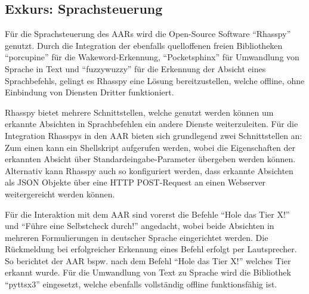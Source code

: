 \subsection{Exkurs: Sprachsteuerung}

Für die Sprachsteuerung des \acp{AAR} wird die Open-Source Software \enquote{Rhasspy} genutzt.
Durch die Integration der ebenfalls quelloffenen freien Bibliotheken \enquote{porcupine} für die Wakeword-Erkennung, \enquote{Pocketsphinx} für Umwandlung von Sprache in Text und \enquote{fuzzywuzzy} für die Erkennung der Absicht eines Sprachbefehls, gelingt es Rhasspy eine Lösung bereitzustellen, welche offline, ohne Einbindung von Diensten Dritter funktioniert.

Rhasspy bietet mehrere Schnittstellen, welche genutzt werden können um erkannte Absichten in Sprachbefehlen ein andere Dienste weiterzuleiten.
Für die Integration Rhasspys in den \ac{AAR} bieten sich grundlegend zwei Schnittstellen an:
Zum einen kann ein Shellskript aufgerufen werden, wobei die Eigenschaften der erkannten Absicht über Standardeingabe-Parameter übergeben werden können.
Alternativ kann Rhasspy auch so konfiguriert werden, dass erkannte Absichten als \ac{JSON} Objekte über eine \ac{HTTP} POST-Request an einen Webserver weitergereicht werden können.

Für die Interaktion mit dem \ac{AAR} sind vorerst die Befehle \enquote{Hole das Tier X!} und \enquote{Führe eine Selbstcheck durch!} angedacht, wobei beide Absichten in mehreren Formulierungen in deutscher Sprache eingerichtet werden.
Die Rückmeldung bei erfolgreicher Erkennung eines Befehl erfolgt per Lautsprecher.
So berichtet der \ac{AAR} bspw. nach dem Befehl \enquote{Hole das Tier X!} welches Tier erkannt wurde.
Für die Umwandlung von Text zu Sprache wird die Bibliothek \enquote{pyttsx3} eingesetzt, welche ebenfalls vollständig offline funktionsfähig ist.
